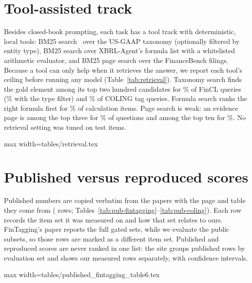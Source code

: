 \documentclass[10pt,twocolumn,a4paper]{article}
\makeatletter
\newcommand{\tabinput}[1]{\@@input #1 }
\makeatother
\begin{document}
\section{Tool-assisted track}\label{sec:tools}
Besides closed-book prompting, each task has a tool track with deterministic, local tools: BM25
search~\cite{robertson2009bm25} over the US-GAAP taxonomy (optionally filtered by entity type), BM25
search over XBRL-Agent's formula list with a whitelisted arithmetic evaluator, and BM25 page search
over the FinanceBench filings. Because a tool can only help when it retrieves the answer, we report
each tool's ceiling before running any model (Table~\ref{tab:retrieval}). Taxonomy search finds the
gold element among its top two hundred candidates for \retFinclAtTwoHundred\% of FinCL queries
(\retFinclTypeAtTwoHundred\% with the type filter) and \retTagAtTwoHundred\% of COLING tag queries.
Formula search ranks the right formula first for \retFormula\% of calculation items. Page search is
weak: an evidence page is among the top three for \retPageThree\% of questions and among the top ten
for \retPageTen\%. No retrieval setting was tuned on test items.

\begin{table}[t]\centering\small
\caption{Taxonomy retrieval: gold element in top $k$ (\%).}\label{tab:retrieval}
\begin{adjustbox}{max width=\columnwidth}\tabinput{tables/retrieval.tex}\end{adjustbox}
\end{table}

\section{Published versus reproduced scores}\label{sec:published}
Published numbers are copied verbatim from the papers with the page and table they come from
(\nPublishedRows{} rows; Tables~\ref{tab:pub-fintagging}--\ref{tab:pub-coling}). Each row records
the item set it was measured on and how that set relates to ours. FinTagging's paper reports the full
gated sets, while we evaluate the public subsets, so those rows are marked as a different item set.
Published and reproduced scores are never ranked in one list: the site groups published rows by
evaluation set and shows our measured rows separately, with confidence intervals.

\begin{table}[t]\centering\small
\caption{Published FinTagging scores (\%), full sets~\cite{wang2025fintagging}.}\label{tab:pub-fintagging}
\begin{adjustbox}{max width=\columnwidth}\tabinput{tables/published_fintagging_table6.tex}\end{adjustbox}
\end{table}
\end{document}
